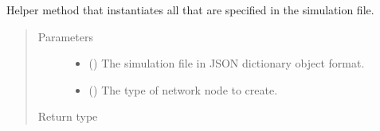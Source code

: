 \documentclass[letterpaper,10pt,english]{sphinxmanual}
\begin{document}
\begin{fulllineitems}
\begin{fulllineitems}
\label{\detokenize{app.domain:app.domain.master_servers.Master._create_network_nodes}}
Helper method that instantiates all
{\hyperref[\detokenize{app.domain:app.domain.network_nodes.Node}]{}} that are
specified in the simulation file.
\begin{quote}\begin{description}
\item[{Parameters}] \leavevmode\begin{itemize}
\item {} 
 (\sphinxstyleliteralemphasis{\sphinxupquote{{[}}}\sphinxstyleliteralemphasis{\sphinxupquote{, }}\sphinxstyleliteralemphasis{\sphinxupquote{{]}}}) \textendash{} The simulation file in JSON dictionary object format.

\item {} 
 () \textendash{} The type of network node to create.

\end{itemize}

\item[{Return type}] \leavevmode
{}

\end{description}\end{quote}

\end{fulllineitems}



\end{fulllineitems}
\end{document}
